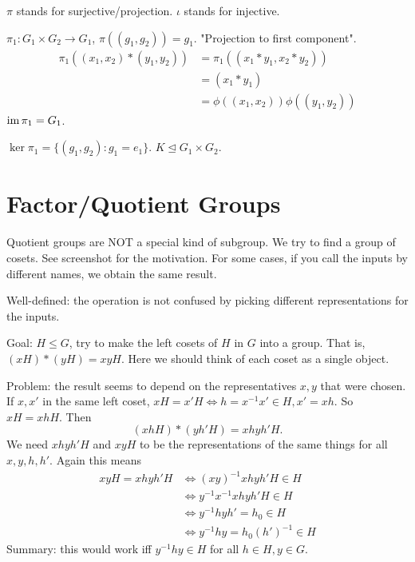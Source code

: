 \documentclass[class=article,crop=false]{standalone}
\begin{document}
\begin{notation}
	$ \pi$ stands for surjective/projection. $ \iota$ stands for injective.
\end{notation}
\begin{eg}[]
	$ \pi_1: G_1 \times G_2 \to G_1$, $ \pi((g_1,g_2))=g_1$. "Projection to first component".
	\begin{align*}
		\pi_1((x_1,x_2)*(y_1,y_2)) &= \pi_1((x_1*y_1,x_2*y_2)) \\
					   &= (x_1*y_1) \\
					   &= \phi((x_1,x_2)) \phi((y_1,y_2)) 
	\end{align*}
	$ \operatorname{im} \pi_1 = G_1$. 

	$ \ker \pi_1  = \{(g_1,g_2): g_1=e_1\} $. $ K \trianglelefteq G_1\times G_2$.
\end{eg}

\section{Factor/Quotient Groups}
\begin{note}[]
	Quotient groups are NOT a special kind of subgroup. We try to find a group of cosets. See screenshot for the motivation. For some cases, if you call the inputs by different names, we obtain the same result.

	Well-defined: the operation is not confused by picking different representations for the inputs.
\end{note}

Goal: $ H \leq G$, try to make the left cosets of  $ H $ in  $ G$ into a group. That is, $ (xH)*(yH) = xyH$. Here we should think of each coset as a single object.

Problem: the result seems to depend on the representatives  $ x,y$ that were chosen. If $ x,x'$ in the same left coset, $ xH=x'H \iff h=x^{-1}x' \in H, x'=xh$. So $ xH=xhH$. Then
\[
	(xhH)*(yh'H) = xhyh'H
.\] 
We need $ xhyh'H $ and  $ xyH$ to be the representations of the same things for all $ x,y,h,h'$. Again this means
\begin{align*}
	xyH = xhyh'H &\iff (xy)^{-1} xhyh'H \in H\\
	& \iff y^{-1}x^{-1}xhyh'H \in H \\
	& \iff y^{-1}hyh' =h_0 \in H \\
	& \iff y^{-1}hy = h_0(h')^{-1} \in H  
\end{align*}
Summary: this would work iff $ y^{-1}hy \in H$ for all $ h \in H, y \in G$.
\end{document}
